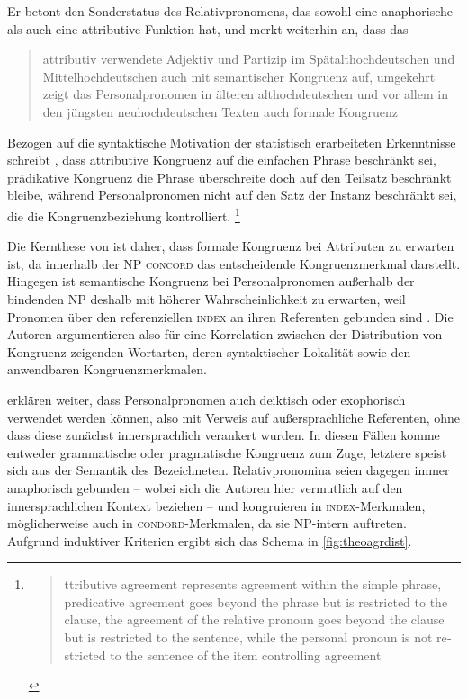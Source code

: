 Er betont den Sonderstatus des Relativpronomens, das sowohl eine anaphorische
als auch eine attributive Funktion hat, und merkt weiterhin an, dass das
\blockcquote[194]{fleischer2012}{attributiv verwendete Adjektiv und Partizip
\textelp{} im Spätalthochdeutschen und Mittelhochdeutschen auch mit
semantischer Kongruenz auf, umgekehrt zeigt das Personalpronomen
in älteren althochdeutschen und vor allem in den jüngsten neuhochdeutschen
Texten auch formale Kongruenz}.

Bezogen auf die syntaktische Motivation der statistisch erarbeiteten
Erkenntnisse schreibt \citet[216]{corbett1979}, dass attributive Kongruenz auf
die einfachen Phrase beschränkt sei, prädikative Kongruenz die Phrase
überschreite doch auf den Teilsatz beschränkt bleibe, während Personalpronomen
nicht auf den Satz der Instanz beschränkt sei, die die Kongruenzbeziehung
kontrolliert.%
%
	\footnote{\foreignblockcquote{english}[216]{corbett1979}{%
		ttributive agreement represents agreement within the simple
		phrase, predicative agreement goes beyond the phrase but is restricted
		to the clause, the agreement of the relative pronoun goes beyond the
		clause but is restricted to the sentence, while the personal pronoun is
		not restricted to the sentence of the item controlling agreement}.}

Die Kernthese von \citet{wechslerzlatic2003} ist daher, dass formale
Kongruenz bei Attributen zu erwarten ist, da innerhalb der NP \textsc{concord} das
entscheidende Kongruenzmerkmal darstellt.
Hingegen ist semantische Kongruenz bei Personalpronomen außerhalb der
bindenden NP deshalb mit höherer Wahrscheinlichkeit zu erwarten, weil Pronomen
über den referenziellen \textsc{index} an ihren Referenten gebunden sind
\citep[89--91]{wechslerzlatic2003}. Die Autoren argumentieren also für eine
Korrelation zwischen der Distribution von Kongruenz zeigenden Wortarten, deren
syntaktischer Lokalität sowie den anwendbaren Kongruenz\-merkmalen.

\cite[89]{wechslerzlatic2003} erklären weiter, dass Personalpronomen auch
deiktisch oder exophorisch verwendet werden können, also mit Verweis auf
außersprachliche Referenten, ohne dass diese zunächst innersprachlich verankert
wurden. In diesen Fällen komme entweder grammatische oder pragmatische
Kongruenz zum Zuge, letztere speist sich aus der Semantik des Bezeichneten.
Relativpronomina seien dagegen immer anaphorisch gebunden -- wobei sich die
Autoren hier vermutlich auf den innersprachlichen Kontext beziehen -- und
kongruieren in \textsc{index}-Merkmalen, möglicherweise auch in \textsc{condord}-Merkmalen, da
sie NP-intern auftreten. Aufgrund induktiver Kriterien ergibt sich das Schema
in \cref{fig:theoagrdist}.

